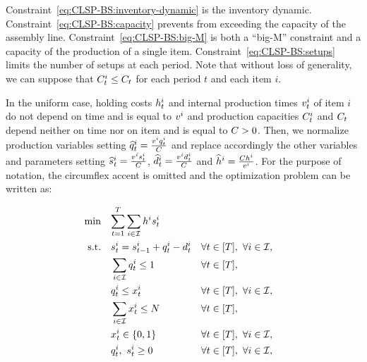 Constraint~\eqref{eq:CLSP-BS:inventory-dynamic} is the inventory dynamic.
Constraint~\eqref{eq:CLSP-BS:capacity} prevents from exceeding the capacity of the assembly line.
Constraint~\eqref{eq:CLSP-BS:big-M} is both a ``big-M'' constraint and a capacity of the production of a single item.
Constraint~\eqref{eq:CLSP-BS:setups} limits the number of setups at each period.
Note that without loss of generality, we can suppose that $C_t^i \le C_t$ for each period $t$ and each item $i$.


\medskip

In the uniform case, holding costs $h_t^i$ and internal production times $v_t^i$ of item $i$ do not depend on time and is equal to $v^i$ and production capacities $C_t^i$ and $C_t$ depend neither on time nor on item and is equal to $C>0$.
Then, we normalize production variables setting $\widehat{q}_t^i=\frac{v^iq_t^i}{C}$ and replace accordingly the other variables and parameters setting $\widehat{s}_t^i=\frac{v^is_t^i}{C}$, $\widehat{d}_t^i=\frac{v^id_t^i}{C}$ and $\widehat{h}^i=\frac{Ch^i}{v^i}$.
For the purpose of notation, the circumflex accent is omitted and the optimization problem can be written as:

\begin{subequations}\label{eq:Uniform-CLSP-BS}
  \begin{align}
    \min\quad & \rlap{$\ds \sum_{t=1}^{\horizon} \sum_{i\in\REF} \holding^i \inventory_t^i$}
    \label{eq:Uniform-CLSP-BS:objective}
    \\
    \st\quad & \ds \inventory_t^i = \inventory_{t-1}^i + \quantity_t^i - \demand_t^i && \forall t\in\range{\horizon},\ \forall i\in\REF,
    \label{eq:Uniform-CLSP-BS:stock-dynamics}
    \\
    & \ds \sum_{i\in\REF} \quantity_t^i \le 1 && \forall t\in\range{\horizon},
    \label{eq:Uniform-CLSP-BS:capacity}
    \\
    & \ds \quantity_t^i \le \setup_t^i && \forall t\in\range{\horizon},\ \forall i\in\REF,
    \label{eq:Uniform-CLSP-BS:item-capacity}
    \\
    & \ds \sum_{i\in\REF} \setup_t^i \le \nbsetups && \forall t\in\range{\horizon},
    \label{eq:Uniform-CLSP-BS:setups}
    \\
    & \ds \setup_t^i \in \crbracket{0,1} && \forall t\in\range{\horizon},\ \forall i\in\REF,
    \label{eq:Uniform-CLSP-BS:boolean}
    \\
    & \ds \quantity_t^i,\ \inventory_t^i \ge 0 && \forall t\in\range{\horizon},\ \forall i\in\REF,
    \label{eq:Uniform-CLSP-BS:positivity}
  \end{align}
\end{subequations}


